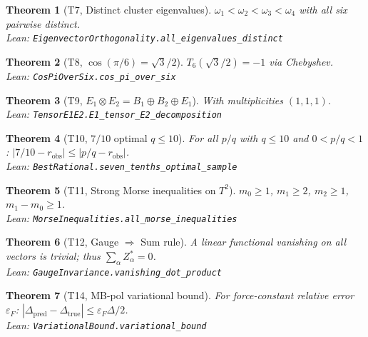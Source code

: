 \documentclass[11pt,a4paper]{article}
\newtheorem{theorem}{Theorem}
\begin{document}
\begin{theorem}[T7, Distinct cluster eigenvalues]\label{thm:T7}
$\omega_1 < \omega_2 < \omega_3 < \omega_4$ with all six pairwise distinct.\\
{\small\emph{Lean: \texttt{EigenvectorOrthogonality.all\_eigenvalues\_distinct}}}
\end{theorem}

\begin{theorem}[T8, $\cos(\pi/6) = \sqrt{3}/2$]\label{thm:T8}
$T_6(\sqrt{3}/2) = -1$ via Chebyshev.\\
{\small\emph{Lean: \texttt{CosPiOverSix.cos\_pi\_over\_six}}}
\end{theorem}

\begin{theorem}[T9, $E_1 \otimes E_2 = B_1 \oplus B_2 \oplus E_1$]\label{thm:T9}
With multiplicities $(1,1,1)$.\\
{\small\emph{Lean: \texttt{TensorE1E2.E1\_tensor\_E2\_decomposition}}}
\end{theorem}

\begin{theorem}[T10, $7/10$ optimal $q\le 10$]\label{thm:T10}
For all $p/q$ with $q \le 10$ and $0 < p/q < 1$: $|7/10 - r_\text{obs}| \le |p/q - r_\text{obs}|$.\\
{\small\emph{Lean: \texttt{BestRational.seven\_tenths\_optimal\_sample}}}
\end{theorem}

\begin{theorem}[T11, Strong Morse inequalities on $T^2$]\label{thm:T11}
$m_0 \ge 1$, $m_1 \ge 2$, $m_2 \ge 1$, $m_1 - m_0 \ge 1$.\\
{\small\emph{Lean: \texttt{MorseInequalities.all\_morse\_inequalities}}}
\end{theorem}

\begin{theorem}[T12, Gauge $\Rightarrow$ Sum rule]\label{thm:T12}
A linear functional vanishing on all vectors is trivial; thus $\sum_\alpha Z^*_\alpha = 0$.\\
{\small\emph{Lean: \texttt{GaugeInvariance.vanishing\_dot\_product}}}
\end{theorem}

\begin{theorem}[T14, MB-pol variational bound]\label{thm:T14}
For force-constant relative error $\varepsilon_F$: $|\Delta_\text{pred} - \Delta_\text{true}| \le \varepsilon_F \Delta/2$.\\
{\small\emph{Lean: \texttt{VariationalBound.variational\_bound}}}
\end{theorem}
\end{document}
